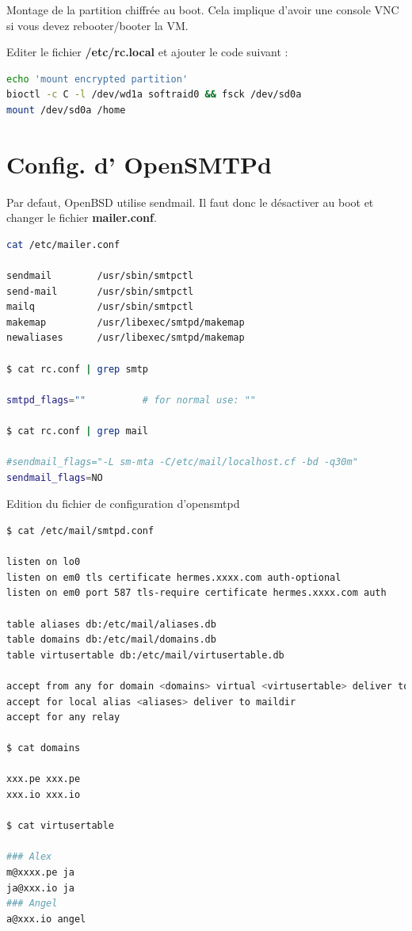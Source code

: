 \documentclass[a4paper,11pt]{article}
\begin{document}
\vspace{5mm}
Montage de la partition chiffrée au boot. Cela implique d'avoir une console VNC
si vous devez rebooter/booter la VM.

Editer le fichier {\bf /etc/rc.local} et ajouter le code suivant :

\vspace{5mm}
\begin{lstlisting}[language=bash,caption={Montage partition chiffrée},frame=bt,breaklines=true]
echo 'mount encrypted partition'
bioctl -c C -l /dev/wd1a softraid0 && fsck /dev/sd0a
mount /dev/sd0a /home
\end{lstlisting}

\vspace{5mm}
\section*{Config. d' OpenSMTPd}

Par defaut, OpenBSD utilise sendmail. Il faut donc le désactiver au boot et
changer le fichier {\bf mailer.conf}.

\vspace{5mm}
\begin{lstlisting}[language=bash,caption={Préparation d'OpenSMTPd},frame=bt,breaklines=true]
cat /etc/mailer.conf

sendmail        /usr/sbin/smtpctl
send-mail       /usr/sbin/smtpctl
mailq           /usr/sbin/smtpctl
makemap         /usr/libexec/smtpd/makemap
newaliases      /usr/libexec/smtpd/makemap

$ cat rc.conf | grep smtp

smtpd_flags=""          # for normal use: ""

$ cat rc.conf | grep mail

#sendmail_flags="-L sm-mta -C/etc/mail/localhost.cf -bd -q30m"
sendmail_flags=NO
\end{lstlisting}

\vspace{5mm}
Edition du fichier de configuration d'opensmtpd

\vspace{5mm}
\begin{lstlisting}[language=bash,caption={Préparation d'OpenSMTPd},frame=bt,breaklines=true]
$ cat /etc/mail/smtpd.conf

listen on lo0
listen on em0 tls certificate hermes.xxxx.com auth-optional
listen on em0 port 587 tls-require certificate hermes.xxxx.com auth

table aliases db:/etc/mail/aliases.db
table domains db:/etc/mail/domains.db
table virtusertable db:/etc/mail/virtusertable.db

accept from any for domain <domains> virtual <virtusertable> deliver to maildir
accept for local alias <aliases> deliver to maildir
accept for any relay

$ cat domains

xxx.pe xxx.pe
xxx.io xxx.io

$ cat virtusertable

### Alex
m@xxxx.pe ja
ja@xxx.io ja
### Angel
a@xxx.io angel
\end{lstlisting}
\end{document}
